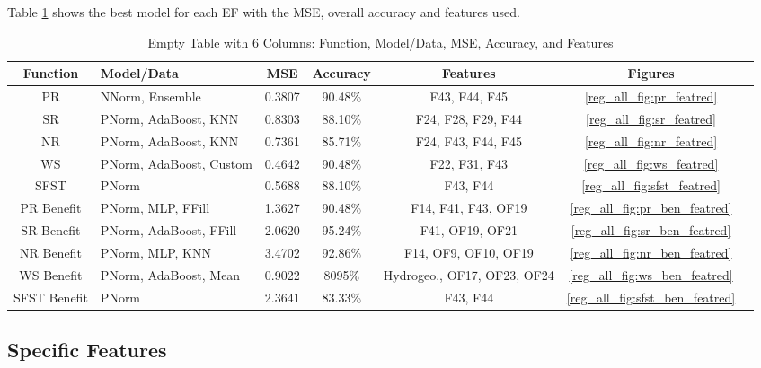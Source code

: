 \documentclass[12pt,letterpaper]{article}
\begin{document}
Table \ref{reg_all_tab:best} shows the best model for each \ac{EF} with the MSE, overall accuracy and features used.

\begin{table}[H]
\centering
\begin{tabular}{|c|p{3cm}|c|c|c|c|c|}
\hline
\textbf{Function} & \textbf{Model/Data} & \textbf{MSE} & \textbf{Accuracy} & \textbf{Features} & \textbf{Figures}  \\
\hline
 PR & NNorm, Ensemble & 0.3807 & 90.48\% & F43, F44, F45 & \ref{reg_all_fig:pr_featred} \\
\hline
 SR & PNorm, AdaBoost, KNN & 0.8303 & 88.10\% & F24, F28, F29, F44 & \ref{reg_all_fig:sr_featred} \\
\hline
 NR & PNorm, AdaBoost, KNN & 0.7361 & 85.71\% & F24, F43, F44, F45 & \ref{reg_all_fig:nr_featred} \\
\hline
 WS & PNorm, AdaBoost, Custom & 0.4642 & 90.48\% & F22, F31, F43 & \ref{reg_all_fig:ws_featred}\\
\hline
 SFST &  PNorm & 0.5688 & 88.10\% &  F43, F44 & \ref{reg_all_fig:sfst_featred}\\
\hline
 PR Benefit & PNorm, MLP, FFill & 1.3627 & 90.48\% & F14, F41, F43, OF19 & \ref{reg_all_fig:pr_ben_featred}\\
\hline
SR Benefit & PNorm, AdaBoost, FFill & 2.0620 & 95.24\% &  F41, OF19, OF21& \ref{reg_all_fig:sr_ben_featred}\\
\hline
 NR Benefit & PNorm, MLP, KNN & 3.4702 & 92.86\% & F14, OF9, OF10, OF19 & \ref{reg_all_fig:nr_ben_featred}\\
\hline
 WS Benefit & PNorm, AdaBoost, Mean & 0.9022 & 8095\% & Hydrogeo., OF17, OF23, OF24  & \ref{reg_all_fig:ws_ben_featred}\\
\hline
 SFST Benefit & PNorm & 2.3641 & 83.33\% & F43, F44 & \ref{reg_all_fig:sfst_ben_featred} \\
\hline
\end{tabular}
\caption{Empty Table with 6 Columns: Function, Model/Data, MSE, Accuracy, and Features}
\label{reg_all_tab:best}
\end{table}



\clearpage
\subsection{Specific Features}
\end{document}
